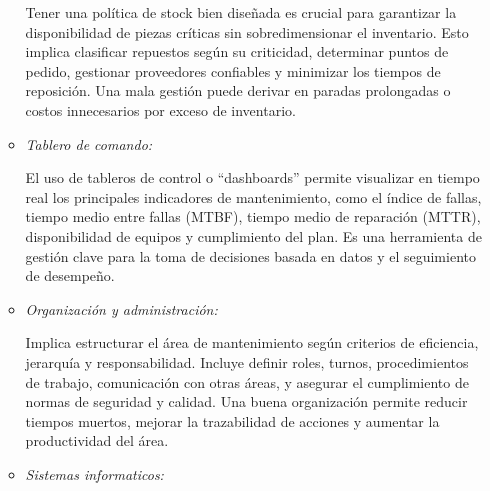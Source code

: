 \documentclass[a4paper,oneside,11pt]{article}
\begin{document}
\begin{enumerate}
\begin{itemize}
        Tener una política de stock bien diseñada es crucial para garantizar la disponibilidad de piezas críticas sin sobredimensionar el inventario. Esto implica clasificar repuestos según su criticidad, determinar puntos de pedido, gestionar proveedores confiables y minimizar los tiempos de reposición. Una mala gestión puede derivar en paradas prolongadas o costos innecesarios por exceso de inventario.

        \item \textit{Tablero de comando:}

        El uso de tableros de control o “dashboards” permite visualizar en tiempo real los principales indicadores de mantenimiento, como el índice de fallas, tiempo medio entre fallas (MTBF), tiempo medio de reparación (MTTR), disponibilidad de equipos y cumplimiento del plan. Es una herramienta de gestión clave para la toma de decisiones basada en datos y el seguimiento de desempeño.

        \item \textit{Organización y administración:}

        Implica estructurar el área de mantenimiento según criterios de eficiencia, jerarquía y responsabilidad. Incluye definir roles, turnos, procedimientos de trabajo, comunicación con otras áreas, y asegurar el cumplimiento de normas de seguridad y calidad. Una buena organización permite reducir tiempos muertos, mejorar la trazabilidad de acciones y aumentar la productividad del área.

        \item \textit{Sistemas informaticos:}


\end{itemize}
\end{enumerate}
\end{document}
